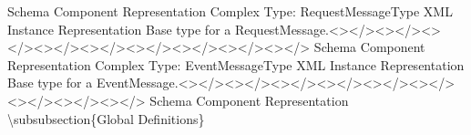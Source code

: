 Schema Component Representation Complex Type: RequestMessageType XML
Instance Representation Base type for a
RequestMessage.\textless\textgreater\textless/\textgreater\textless\textgreater\textless/\textgreater\textless\textgreater\textless/\textgreater\textless\textgreater\textless/\textgreater\textless\textgreater\textless/\textgreater\textless\textgreater\textless/\textgreater\textless\textgreater\textless/\textgreater\textless\textgreater\textless/\textgreater\textless\textgreater\textless/\textgreater{}
Schema Component Representation Complex Type: EventMessageType XML
Instance Representation Base type for a
EventMessage.\textless\textgreater\textless/\textgreater\textless\textgreater\textless/\textgreater\textless\textgreater\textless/\textgreater\textless\textgreater\textless/\textgreater\textless\textgreater\textless/\textgreater\textless\textgreater\textless/\textgreater\textless\textgreater\textless/\textgreater\textless\textgreater\textless/\textgreater\textless\textgreater\textless/\textgreater{}
Schema Component Representation \textbackslash subsubsection\{Global
Definitions\}
